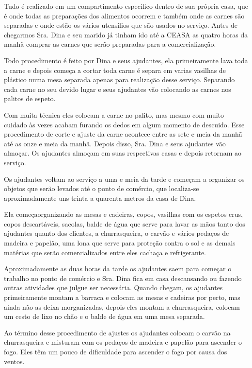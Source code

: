 Tudo é realizado em um compartimento especifico dentro de sua própria casa, que é onde todas as preparações dos alimentos ocorrem e também onde as carnes são separadas e onde estão os vários utensílios que são usados no serviço. Antes de chegarmos Sra. Dina e seu marido já tinham ido até a CEASA as quatro horas da manhã comprar as carnes que serão preparadas para a comercialização.

Todo procedimento é feito por Dina e seus ajudantes, ela primeiramente lava toda a carne e depois começa a cortar toda carne é separa em varias vasilhas de plástico numa mesa separada apenas para realização desse serviço. Separando cada carne no seu devido lugar e seus ajudantes vão colocando as carnes nos palitos de espeto.

Com muita técnica eles colocam a carne no palito, mas mesmo com muito cuidado às vezes acabam furando os dedos em algum momento de descuido. Esse procedimento de corte e ajuste da carne acontece entre as sete e meia da manhã até as onze e meia da manhã. Depois disso, Sra. Dina e seus ajudantes vão almoçar. Os ajudantes almoçam em suas respectivas casas e depois retornam ao serviço.

Os ajudantes voltam ao serviço a uma e meia da tarde e começam a organizar os objetos que serão levados até o ponto de comércio, que localiza-se aproximadamente uns trinta a quarenta metros da casa de Dina. 

Ela começaorganizando as mesas e cadeiras, copos, vasilhas com os espetos crus, copos descartáveis, sacolas, balde de água que serve para lavar as mãos tanto dos ajudantes quanto dos clientes, a churrasqueira, o carvão e vários pedaços de madeira e papelão, uma lona que serve para proteção contra o sol e as demais matérias que serão comercializados entre eles cachaça e refrigerante.

Aproximadamente as duas horas da tarde os ajudantes saem para começar o trabalho no ponto de comércio e Sra. Dina fica em casa descansando ou fazendo outras atividades que julgue ser necessária. Quando chegam, os ajudantes primeiramente montam a barraca e colocam as mesas e cadeiras por perto, mas ainda não as deixa morganizadas, depois eles montam a churrasqueira, colocam um cesto de lixo no chão e o balde de água em uma mesa separada.

Ao término desse procedimento de ajustes os ajudantes colocam o carvão na churrasqueira e misturam com os pedaços de madeira e papelão para ascender o fogo. Eles têm um pouco de dificuldade para ascender o fogo por causa dos ventos.

